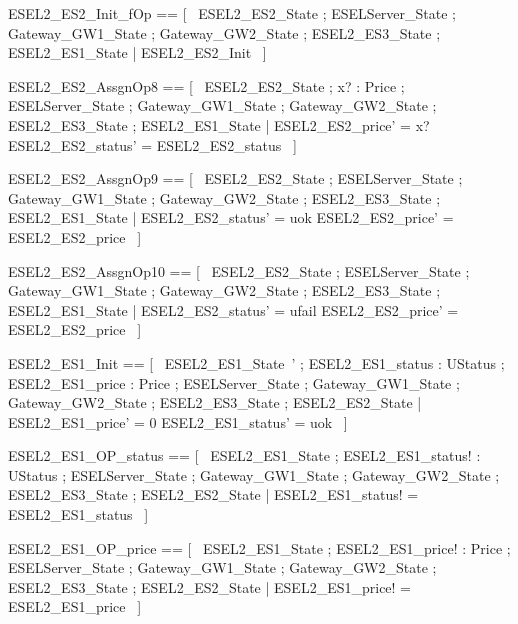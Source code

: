 \documentclass{article}
\begin{document}
\begin{zed}
	ESEL2\_ES2\_Init\_fOp == [~  \Xi ESEL2\_ES2\_State ; \Xi ESELServer\_State ; \Xi Gateway\_GW1\_State ; \Xi Gateway\_GW2\_State ; \Xi ESEL2\_ES3\_State ; \Xi ESEL2\_ES1\_State | \lnot \pre ESEL2\_ES2\_Init  ~]
\end{zed}

\begin{zed}
	ESEL2\_ES2\_AssgnOp8 == [~  \Delta ESEL2\_ES2\_State ; x? : Price ; \Xi ESELServer\_State ; \Xi Gateway\_GW1\_State ; \Xi Gateway\_GW2\_State ; \Xi ESEL2\_ES3\_State ; \Xi ESEL2\_ES1\_State | ESEL2\_ES2\_price' = x? \land ESEL2\_ES2\_status' = ESEL2\_ES2\_status  ~]
\end{zed}

\begin{zed}
	ESEL2\_ES2\_AssgnOp9 == [~  \Delta ESEL2\_ES2\_State ; \Xi ESELServer\_State ; \Xi Gateway\_GW1\_State ; \Xi Gateway\_GW2\_State ; \Xi ESEL2\_ES3\_State ; \Xi ESEL2\_ES1\_State | ESEL2\_ES2\_status' = uok \land ESEL2\_ES2\_price' = ESEL2\_ES2\_price  ~]
\end{zed}

\begin{zed}
	ESEL2\_ES2\_AssgnOp10 == [~  \Delta ESEL2\_ES2\_State ; \Xi ESELServer\_State ; \Xi Gateway\_GW1\_State ; \Xi Gateway\_GW2\_State ; \Xi ESEL2\_ES3\_State ; \Xi ESEL2\_ES1\_State | ESEL2\_ES2\_status' = ufail \land ESEL2\_ES2\_price' = ESEL2\_ES2\_price  ~]
\end{zed}

\begin{zed}
	ESEL2\_ES1\_Init == [~  ESEL2\_ES1\_State~' ; ESEL2\_ES1\_status : UStatus ; ESEL2\_ES1\_price : Price ; \Xi ESELServer\_State ; \Xi Gateway\_GW1\_State ; \Xi Gateway\_GW2\_State ; \Xi ESEL2\_ES3\_State ; \Xi ESEL2\_ES2\_State | ESEL2\_ES1\_price' = 0 \land ESEL2\_ES1\_status' = uok  ~]
\end{zed}

\begin{zed}
	ESEL2\_ES1\_OP\_status == [~  \Xi ESEL2\_ES1\_State ; ESEL2\_ES1\_status! : UStatus ; \Xi ESELServer\_State ; \Xi Gateway\_GW1\_State ; \Xi Gateway\_GW2\_State ; \Xi ESEL2\_ES3\_State ; \Xi ESEL2\_ES2\_State | ESEL2\_ES1\_status! = ESEL2\_ES1\_status  ~]
\end{zed}

\begin{zed}
	ESEL2\_ES1\_OP\_price == [~  \Xi ESEL2\_ES1\_State ; ESEL2\_ES1\_price! : Price ; \Xi ESELServer\_State ; \Xi Gateway\_GW1\_State ; \Xi Gateway\_GW2\_State ; \Xi ESEL2\_ES3\_State ; \Xi ESEL2\_ES2\_State | ESEL2\_ES1\_price! = ESEL2\_ES1\_price  ~]
\end{zed}
\end{document}
